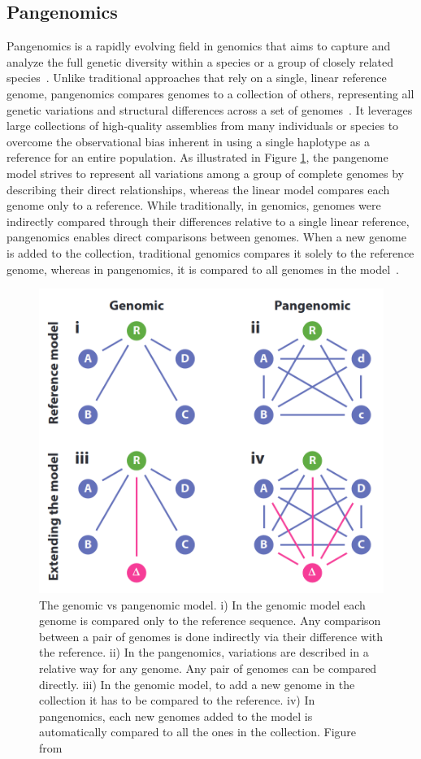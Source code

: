 \subsection{Pangenomics}
Pangenomics is a rapidly evolving field in genomics that aims to capture and analyze the full genetic diversity within a species or a group of closely related species~\cite{allonce,cpmarshall,drafthpg}. Unlike traditional approaches that rely on a single, linear reference genome, pangenomics compares genomes to a collection of others, representing all genetic variations and structural differences across a set of genomes~\cite{cpmarshall,drafthpg}. It leverages large collections of high-quality assemblies from many individuals or species to overcome the observational bias inherent in using a single haplotype as a reference for an entire population. As illustrated in Figure \ref{fig:pangenomics_model}, the pangenome model strives to represent all variations among a group of complete genomes by describing their direct relationships, whereas the linear model compares each genome only to a reference. While traditionally, in genomics, genomes were indirectly compared through their differences relative to a single linear reference, pangenomics enables direct comparisons between genomes. When a new genome is added to the collection, traditional genomics compares it solely to the reference genome, whereas in pangenomics, it is compared to all genomes in the model~\cite{cpmarshall}.
\begin{figure}[h!]
	\centering
	\includegraphics[width=.75\linewidth]{figures/background/pangenome_model.png}
	\caption[The Pangenome model.]{The genomic vs pangenomic model. i) In the genomic model each genome is compared only to the reference sequence. Any comparison between a pair of genomes is done indirectly via their difference with the reference. ii) In the pangenomics, variations are described in a relative way for any genome. Any pair of genomes can be compared directly. iii) In the genomic model, to add a new genome in the collection it has to be compared to the reference. iv) In pangenomics, each new genomes added to the model is automatically compared to all the ones in the collection. Figure from~\cite{eizenga}\\}
	\label{fig:pangenomics_model}
\end{figure}
